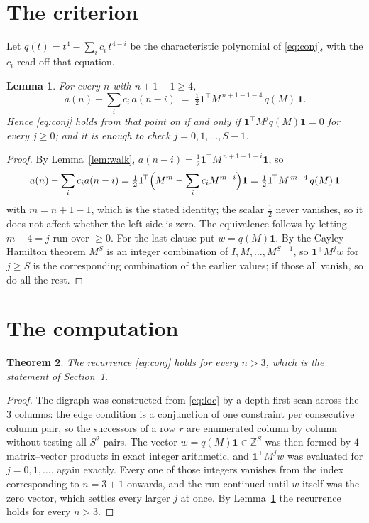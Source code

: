 \documentclass[11pt,a4paper]{article}
\theoremstyle{plain}
\newtheorem{theorem}{Theorem}
\newtheorem{lemma}[theorem]{Lemma}
\theoremstyle{definition}
\begin{document}
\section{The criterion}

Let $q(t)=t^{4}-\sum_i c_i\,t^{4-i}$ be the characteristic polynomial of
\eqref{eq:conj}, with the $c_i$ read off that equation.

\begin{lemma}\label{lem:crit}
For every $n$ with $n+1-1\ge4$,
\[
a(n)-\sum_i c_i\,a(n-i)\;=\;\tfrac1{2}\mathbf{1}^{\!\top}M^{\,n+1-1-4}\,q(M)\,\mathbf{1} .
\]
Hence \eqref{eq:conj} holds from that point on if and only if
$\mathbf{1}^{\!\top}M^{j}q(M)\mathbf{1}=0$ for every $j\ge0$; and it is enough to check
$j=0,1,\dots,S-1$.
\end{lemma}

\begin{proof}
By Lemma~\ref{lem:walk}, $a(n-i)=\tfrac1{2}\mathbf{1}^{\!\top}M^{\,n+1-1-i}\mathbf{1}$, so
\[
a(n)-\sum_i c_i a(n-i)
=\tfrac1{2}\mathbf{1}^{\!\top}\Bigl(M^{m}-\sum_i c_i M^{m-i}\Bigr)\mathbf{1}
=\tfrac1{2}\mathbf{1}^{\!\top}M^{\,m-4}\,q(M)\,\mathbf{1}
\]
with $m=n+1-1$, which is the stated identity; the scalar $\tfrac1{2}$ never vanishes, so
it does not affect whether the left side is zero. The equivalence follows by letting
$m-4=j$ run over $\ge0$. For the last clause put $w=q(M)\mathbf{1}$. By the
Cayley--Hamilton theorem $M^{S}$ is an integer combination of $I,M,\dots,M^{S-1}$, so
$\mathbf{1}^{\!\top}M^{j}w$ for $j\ge S$ is the corresponding combination of the earlier
values; if those all vanish, so do all the rest.
\end{proof}

\section{The computation}

\begin{theorem}
The recurrence \eqref{eq:conj} holds for every $n>3$, which is the statement of
Section~1.
\end{theorem}

\begin{proof}
The digraph was constructed from \eqref{eq:loc} by a depth-first scan across the $3$
columns: the edge condition is a conjunction of one constraint per consecutive column
pair, so the successors of a row $r$ are enumerated column by column without testing all
$S^2$ pairs. The vector $w=q(M)\mathbf{1}\in\mathbb{Z}^{S}$ was then formed by $4$
matrix--vector products in exact integer arithmetic, and $\mathbf{1}^{\!\top}M^{j}w$ was
evaluated for $j=0,1,\dots$, again exactly. Every one of those integers vanishes from the
index corresponding to $n=3+1$ onwards, and the run continued until $w$ itself was the
zero vector, which settles every larger $j$ at once. By Lemma~\ref{lem:crit} the recurrence
holds for every $n>3$.
\end{proof}
\end{document}
